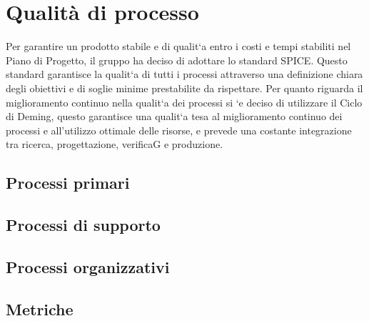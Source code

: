 \section{Qualità di processo}
Per garantire un prodotto stabile e di qualit`a entro i costi e tempi stabiliti nel Piano
di Progetto, il gruppo ha deciso di adottare lo standard SPICE.
Questo standard garantisce la qualit`a di tutti i processi attraverso una definizione
chiara degli obiettivi e di soglie minime prestabilite da rispettare. Per quanto riguarda il miglioramento continuo nella qualit`a dei processi si `e deciso di utilizzare il
Ciclo di Deming, questo garantisce una qualit`a tesa al miglioramento continuo dei
processi e all'utilizzo ottimale delle risorse, e prevede una costante integrazione tra
ricerca, progettazione, verificaG e produzione.
\subsection{Processi primari}
\subsection{Processi di supporto}
\subsection{Processi organizzativi}
\subsection{Metriche}